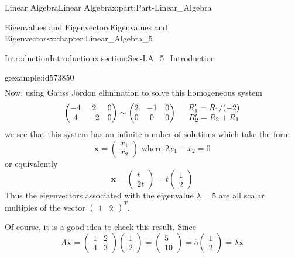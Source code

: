 \documentclass[oneside,10pt,]{book}
\numberwithin{equation}{section}
\newcommand{\amp}{&}
\begin{document}
\begin{partptx}{Linear Algebra}{}{Linear Algebra}{}{}{x:part:Part-Linear_Algebra}
\begin{chapterptx}{Eigenvalues and Eigenvectors}{}{Eigenvalues and Eigenvectors}{}{}{x:chapter:Linear_Algebra_5}
\begin{sectionptx}{Introduction}{}{Introduction}{}{}{x:section:Sec-LA_5_Introduction}
\begin{example}{}{g:example:id573850}
\begin{align*}
\end{align*}
Now, using Gauss Jordon elimination to solve this homogeneous system%
\begin{equation*}
\begin{pmatrix} -4 \amp 2 \amp 0 \\ 4 \amp -2 \amp 0 \end{pmatrix} \sim \begin{pmatrix} 2 \amp -1 \amp 0 \\ 0 \amp 0 \amp 0 \end{pmatrix}  \begin{matrix} \hspace{5mm} R_1'=R_1/(-2) \\ \hspace{5mm} R_2'=R_2+R_1 \end{matrix}
\end{equation*}
we see that this system has an infinite number of solutions which take the form%
\begin{equation*}
\mathbf{x}=\begin{pmatrix} x_1 \\ x_2 \end{pmatrix} \textrm{ where } 2x_1-x_2=0
\end{equation*}
or equivalently%
\begin{equation*}
\mathbf{x}=\begin{pmatrix} t \\ 2t \end{pmatrix}=t\begin{pmatrix} 1 \\ 2 \end{pmatrix}
\end{equation*}
Thus the eigenvectors associated with the eigenvalue \(\lambda=5\) are all scalar multiples of the vector \(\begin{pmatrix} 1 \amp 2 \end{pmatrix}^T\).%
\par
Of course, it is a good idea to check this result. Since%
\begin{equation*}
A\mathbf{x}=\begin{pmatrix} 1 \amp 2 \\ 4 \amp 3 \end{pmatrix} \begin{pmatrix} 1 \\ 2 \end{pmatrix}=\begin{pmatrix} 5 \\ 10 \end{pmatrix}=5\begin{pmatrix} 1 \\ 2 \end{pmatrix}=\lambda\mathbf{x}

\end{equation*}
\end{example}
\end{sectionptx}
\end{chapterptx}
\end{partptx}
\end{document}
